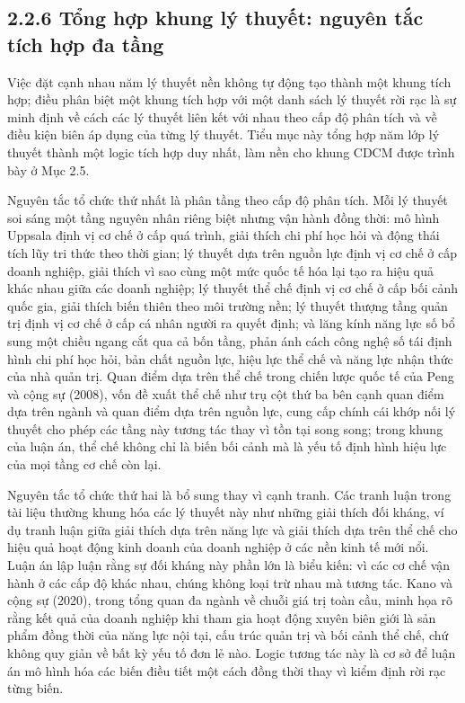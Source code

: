 \documentclass[
  a4paper,
  13pt]{extreport}
\begin{document}
\hypertarget{tux1ed5ng-hux1ee3p-khung-luxfd-thuyux1ebft-nguyuxean-tux1eafc-tuxedch-hux1ee3p-ux111a-tux1ea7ng}{%
\subsection{2.2.6 Tổng hợp khung lý thuyết: nguyên tắc tích hợp đa
tầng}\label{tux1ed5ng-hux1ee3p-khung-luxfd-thuyux1ebft-nguyuxean-tux1eafc-tuxedch-hux1ee3p-ux111a-tux1ea7ng}}

Việc đặt cạnh nhau năm lý thuyết nền không tự động tạo thành một khung
tích hợp; điều phân biệt một khung tích hợp với một danh sách lý thuyết
rời rạc là sự minh định về cách các lý thuyết liên kết với nhau theo cấp
độ phân tích và về điều kiện biên áp dụng của từng lý thuyết. Tiểu mục
này tổng hợp năm lớp lý thuyết thành một logic tích hợp duy nhất, làm
nền cho khung CDCM được trình bày ở Mục 2.5.

Nguyên tắc tổ chức thứ nhất là phân tầng theo cấp độ phân tích. Mỗi lý
thuyết soi sáng một tầng nguyên nhân riêng biệt nhưng vận hành đồng
thời: mô hình Uppsala định vị cơ chế ở cấp quá trình, giải thích chi phí
học hỏi và động thái tích lũy tri thức theo thời gian; lý thuyết dựa
trên nguồn lực định vị cơ chế ở cấp doanh nghiệp, giải thích vì sao cùng
một mức quốc tế hóa lại tạo ra hiệu quả khác nhau giữa các doanh nghiệp;
lý thuyết thể chế định vị cơ chế ở cấp bối cảnh quốc gia, giải thích
biến thiên theo môi trường nền; lý thuyết thượng tầng quản trị định vị
cơ chế ở cấp cá nhân người ra quyết định; và lăng kính năng lực số bổ
sung một chiều ngang cắt qua cả bốn tầng, phản ánh cách công nghệ số tái
định hình chi phí học hỏi, bản chất nguồn lực, hiệu lực thể chế và năng
lực nhận thức của nhà quản trị. Quan điểm dựa trên thể chế trong chiến
lược quốc tế của Peng và cộng sự (2008), vốn đề xuất thể chế như trụ cột
thứ ba bên cạnh quan điểm dựa trên ngành và quan điểm dựa trên nguồn
lực, cung cấp chính cái khớp nối lý thuyết cho phép các tầng này tương
tác thay vì tồn tại song song; trong khung của luận án, thể chế không
chỉ là biến bối cảnh mà là yếu tố định hình hiệu lực của mọi tầng cơ chế
còn lại.

Nguyên tắc tổ chức thứ hai là bổ sung thay vì cạnh tranh. Các tranh luận
trong tài liệu thường khung hóa các lý thuyết này như những giải thích
đối kháng, ví dụ tranh luận giữa giải thích dựa trên năng lực và giải
thích dựa trên thể chế cho hiệu quả hoạt động kinh doanh của doanh
nghiệp ở các nền kinh tế mới nổi. Luận án lập luận rằng sự đối kháng này
phần lớn là biểu kiến: vì các cơ chế vận hành ở các cấp độ khác nhau,
chúng không loại trừ nhau mà tương tác. Kano và cộng sự (2020), trong
tổng quan đa ngành về chuỗi giá trị toàn cầu, minh họa rõ rằng kết quả
của doanh nghiệp khi tham gia hoạt động xuyên biên giới là sản phẩm đồng
thời của năng lực nội tại, cấu trúc quản trị và bối cảnh thể chế, chứ
không quy giản về bất kỳ yếu tố đơn lẻ nào. Logic tương tác này là cơ sở
để luận án mô hình hóa các biến điều tiết một cách đồng thời thay vì
kiểm định rời rạc từng biến.
\end{document}
